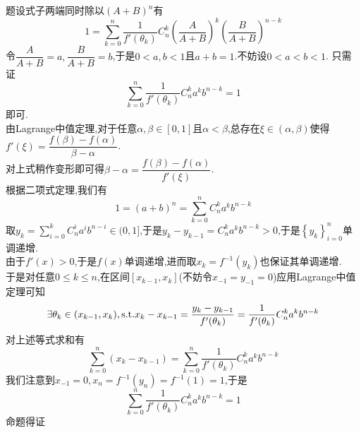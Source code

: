 \documentclass{ctexart}
\begin{document}
\begin{solution}[Proof.]
    题设式子两端同时除以$(A+B)^n$有
    $$1=\sum_{k=0}^{n}\dfrac{1}{f'(\theta_k)}C_n^k\left(\dfrac{A}{A+B}\right)^k\left(\dfrac{B}{A+B}\right)^{n-k}$$
    令$\dfrac{A}{A+B}=a,\dfrac{B}{A+B}=b$,于是$0<a,b<1$且$a+b=1$.不妨设$0<a<b<1$.
    只需证$$\sum_{k=0}^{n}\dfrac{1}{f'(\theta_k)}C^k_na^kb^{n-k}=1$$即可.\\
    由Lagrange中值定理,对于任意$\alpha,\beta\in[0,1]$且$\alpha<\beta$,总存在$\xi\in(\alpha,\beta)$使得$f'(\xi)=\dfrac{f(\beta)-f(\alpha)}{\beta-\alpha}$.\\
    对上式稍作变形即可得$\beta-\alpha=\dfrac{f(\beta)-f(\alpha)}{f'(\xi)}$.\\
    根据二项式定理,我们有
    $$1=(a+b)^n=\sum_{k=0}^{n}C_n^ka^kb^{n-k}$$
    取$\displaystyle y_k=\sum_{i=0}^{k}C_n^ia^ib^{n-i}\in(0,1]$,于是$y_{k}-y_{k-1}=C_n^ka^kb^{n-k}>0$,于是$\left\{y_k\right\}_{i=0}^{n}$单调递增.\\
    由于$f'(x)>0$,于是$f(x)$单调递增,进而取$x_k=f^{-1}(y_k)$也保证其单调递增.\\
    于是对任意$0\leqslant k\leqslant n$,在区间$[x_{k-1},x_k]$(不妨令$x_{-1}=y_{-1}=0$)应用Lagrange中值定理可知
    $$\exists\theta_k\in(x_{k-1},x_k),\text{s.t.} x_{k}-x_{k-1}=\dfrac{y_{k}-y_{k-1}}{f'(\theta_k)}=\dfrac{1}{f'(\theta_k)}C_n^ka^kb^{n-k}$$
    对上述等式求和有
    $$\sum_{k=0}^{n}\left(x_k-x_{k-1}\right)=\sum_{k=0}^{n}\dfrac{1}{f'(\theta_k)}C^k_na^kb^{n-k}$$
    我们注意到$x_{-1}=0,x_n=f^{-1}(y_n)=f^{-1}(1)=1$,于是
    $$\sum_{k=0}^{n}\dfrac{1}{f'(\theta_k)}C^k_na^kb^{n-k}=1$$
    命题得证
\end{solution}
\end{document}
